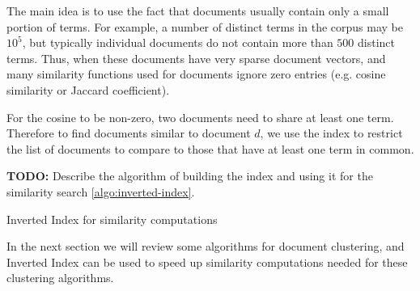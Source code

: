 %


The main idea is to use the fact that documents usually contain only
a small portion of terms. For example, a number of distinct terms in
the corpus may be $10^5$, but typically individual documents do not
contain more than $500$ distinct terms. %
Thus, when these documents have very sparse document vectors, and many
similarity functions used for documents ignore zero entries
(e.g. cosine similarity or Jaccard coefficient).

For the cosine to be non-zero, two documents need to share at least one term.
Therefore to find documents similar to document $d$, we use the index to
restrict the list of documents to compare to those that
have at least one term in common.

\textbf{TODO: }Describe the algorithm of building the index and using it for the 
similarity search \ref{algo:inverted-index}.

\begin{algorithm}
\caption{Inverted Index for similarity computations}
\label{algo:inverted-index}
\begin{algorithmic}[0]
  \Statex
    \EndFor
      \EndFor
    \EndFor
    \State {}
  \EndFunction
\end{algorithmic}

\begin{algorithmic}[0]
  \Statex
       
    \EndFor
    \State {}
  \EndFunction
\end{algorithmic}
\end{algorithm}


In the next section we will review some algorithms for document clustering,
and Inverted Index can be used to speed up similarity computations
needed for these clustering algorithms. 